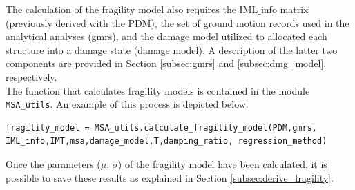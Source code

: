 The calculation of the fragility model also requires the IML$\_$info matrix (previously derived with the PDM), the set of ground motion records used in the analytical analyses (gmrs), and the damage model utilized to allocated each structure into a damage state (damage$\_$model). A description of the latter two components are provided in Section \ref{subsec:gmrs} and \ref{subsec:dmg_model}, respectively.\\
The function that calculates fragility models is contained in the module \verb=MSA_utils=. An example of this process is depicted below.

\begin{Verbatim}[frame=single, commandchars=\\\{\}, samepage=true]
fragility_model = MSA_utils.calculate_fragility_model(PDM,gmrs,
IML_info,IMT,msa,damage_model,T,damping_ratio, regression_method)
\end{Verbatim}

Once the parameters ($\mu$, $\sigma$) of the fragility model have been calculated, it is possible to save these results as explained in Section \ref{subsec:derive_fragility}.
